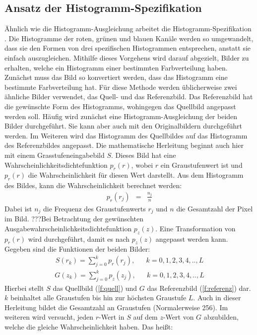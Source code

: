   \subsection{Ansatz der Histogramm-Spezifikation}\label{s.hs}
Ähnlich wie die Histogramm-Ausgleichung arbeitet die Histogramm-Spezifikation\\ \cite{goatman2003colour}. Die Histogramme der roten, grünen und blauen Kanäle werden so umgewandelt, dass sie den Formen von drei spezifischen Histogrammen entsprechen, anstatt sie einfach auszugleichen. Mithilfe dieses Vorgehens wird darauf abgezielt, Bilder zu erhalten, welche ein Histogramm einer bestimmten Farbverteilung haben. Zunächst muss das Bild so konvertiert werden, dass das Histogramm eine bestimmte Farbverteilung hat. Für diese Methode werden üblicherweise zwei ähnliche Bilder verwendet, das Quell- und das Referenzbild. Das Referenzbild hat die gewünschte Form des Histogramms, wohingegen das Quellbild angepasst werden soll. Häufig wird zunächst eine Histogramm-Ausgleichung der beiden Bilder durchgeführt. Sie kann aber auch mit den Originalbildern durchgeführt werden. Im Weiteren wird das Histogramm des Quellbildes auf das Histogramm des Referenzbildes angepasst. Die mathematische Herleitung beginnt auch hier mit einem Grasstufeneingabebild $S$. 
Dieses Bild hat eine Wahrscheinlichkeitsdichtefunktion $p_{r}(r)$, wobei $r$ ein Graustufenwert ist und $p_{r}(r)$ die Wahrscheinlichkeit für diesen Wert darstellt. Aus dem Histogramm des Bildes, kann die Wahrscheinlichkeit berechnet werden:
\begin{eqnarray} p_{r}(r_{j})&=&\frac{n_{j}}{n} \end{eqnarray}
Dabei ist $n_{j}$ die Frequenz des Graustufenwerts $r_{j}$ und $n$ die Gesamtzahl der Pixel im Bild. ???Bei Betrachtung der gewünschten Ausgabewahrscheinlichkeitsdichtefunktion $p_{z}(z)$. Eine Transformation von $p_{r}(r)$ wird durchgeführt, damit es nach $p_{z}(z)$ angepasst werden kann. Gegeben sind die Funktionen der beiden Bilder: 
\begin{align} \label{f:quell} S(r_{k})=\sum_{j=0}^k p_{r}(r_{j}) ,& &k=0,1,2,3,4,..,L\end{align}
\begin{align} \label{f:referenz} G(z_{k})=\sum_{j=0}^k p_{z}(z_{j}) ,& &k=0,1,2,3,4,.., L \end{align}
Hierbei stellt $S$ das Quellbild (\ref{f:quell}) und $G$ das Referenzbild (\ref{f:referenz}) dar. $k$ beinhaltet alle Graustufen bis hin zur höchsten Graustufe $L$.   
Auch in dieser Herleitung bildet die Gesamtzahl an Graustufen (Normalerweise 256). Im weiteren wird versucht, jeden $r$-Wert in $S$ auf dem $z$-Wert von $G$ abzubilden, welche die gleiche Wahrscheinlichkeit haben. Das heißt:
